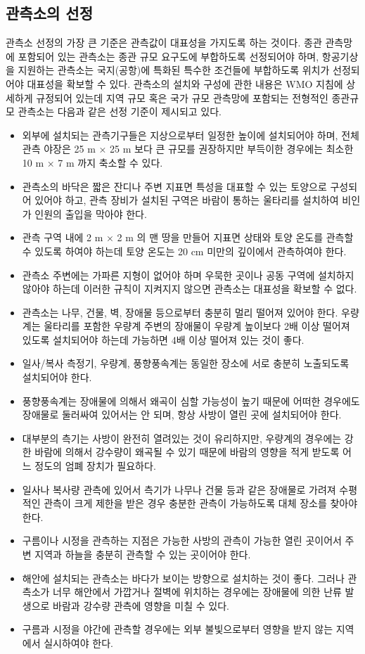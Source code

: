 \subsection{관측소의 선정}
관측소 선정의 가장 큰 기준은 관측값이 대표성을 가지도록 하는 것이다. 종관 관측망에 포함되어 있는 관측소는 종관 규모 요구도에 부합하도록 선정되어야 하며, 항공기상을 지원하는 관측소는 국지(공항)에 특화된 특수한 조건들에 부합하도록 위치가 선정되어야 대표성을 확보할 수 있다. 관측소의 설치와 구성에 관한 내용은 WMO 지침에 상세하게 규정되어 있는데
지역 규모 혹은 국가 규모 관측망에 포함되는 전형적인 종관규모 관측소는 다음과 같은 선정 기준이 제시되고 있다.

\begin{itemize}
	\item 외부에 설치되는 관측기구들은 지상으로부터 일정한 높이에 설치되어야 하며, 전체 관측 야장은 25 m × 25 m 보다 큰 규모를 권장하지만 부득이한 경우에는 최소한 10 m × 7 m 까지 축소할 수 있다. 
	\item 관측소의 바닥은 짧은 잔디나 주변 지표면 특성을 대표할 수 있는 토양으로 구성되어 있어야 하고, 관측 장비가 설치된 구역은 바람이 통하는 울타리를 설치하여 비인가 인원의 출입을 막아야 한다. 
	\item 관측 구역 내에 2 m × 2 m 의 맨 땅을 만들어 지표면 상태와 토양 온도를 관측할 수 있도록 하여야 하는데 토양 온도는 20 cm 미만의 깊이에서 관측하여야 한다.
	\item 관측소 주변에는 가파른 지형이 없어야 하며 우묵한 곳이나 공동 구역에 설치하지 않아야 하는데 이러한 규칙이 지켜지지 않으면 관측소는 대표성을 확보할 수 없다.
	\item 관측소는 나무, 건물, 벽, 장애물 등으로부터 충분히 멀리 떨어져 있어야 한다. 우량계는 울타리를 포함한 우량계 주변의 장애물이 우량계 높이보다 2배 이상 떨어져 있도록 설치되어야 하는데 가능하면 4배 이상 떨어져 있는 것이 좋다.
	\item 일사/복사 측정기, 우량계, 풍향풍속계는 동일한 장소에 서로 충분히 노출되도록 설치되어야 한다.
	\item 풍향풍속계는 장애물에 의해서 왜곡이 심할 가능성이 높기 때문에 어떠한 경우에도 장애물로 둘러싸여 있어서는 안 되며, 항상 사방이 열린 곳에 설치되어야 한다.
	\item 대부분의 측기는 사방이 완전히 열려있는 것이 유리하지만, 우량계의 경우에는 강한 바람에 의해서 강수량이 왜곡될 수 있기 때문에 바람의 영향을 적게 받도록 어느 정도의 엄폐 장치가 필요하다.
	\item 일사나 복사량 관측에 있어서 측기가 나무나 건물 등과 같은 장애물로 가려져 수평적인 관측이 크게 제한을 받은 경우 충분한 관측이 가능하도록 대체 장소를 찾아야 한다.
	\item 구름이나 시정을 관측하는 지점은 가능한 사방의 관측이 가능한 열린 곳이어서 주변 지역과 하늘을 충분히 관측할 수 있는 곳이어야 한다.
	\item 해안에 설치되는 관측소는 바다가 보이는 방향으로 설치하는 것이 좋다. 그러나 관측소가 너무 해안에서 가깝거나 절벽에 위치하는 경우에는 장애물에 의한 난류 발생으로 바람과 강수량 관측에 영향을 미칠 수 있다.
	\item 구름과 시정을 야간에 관측할 경우에는 외부 불빛으로부터 영향을 받지 않는 지역에서 실시하여야 한다.
\end{itemize}

